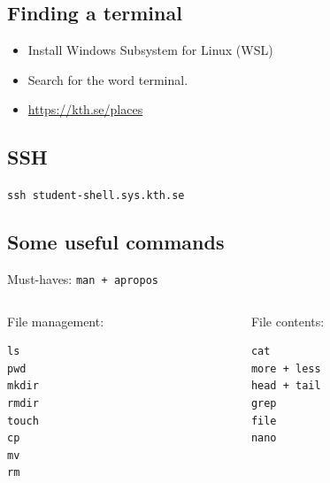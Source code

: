 \subsection{Finding a terminal}

\begin{frame}
  \begin{example}[Windows]
    \begin{itemize}
      \item Install Windows Subsystem for Linux (WSL)
    \end{itemize}
  \end{example}

  \begin{example}[Mac]
    \begin{itemize}
      \item Search for the word terminal.
    \end{itemize}
  \end{example}

  \begin{remark}
    \begin{itemize}
      \item \url{https://kth.se/places}
    \end{itemize}
  \end{remark}
\end{frame}

\subsection{SSH}

\begin{frame}
  \lstinline{ssh student-shell.sys.kth.se}
\end{frame}

\subsection{Some useful commands}

\begin{frame}[fragile]
  Must-haves: \lstinline{man + apropos}
  \vspace{1em}

  \begin{columns}[t]
    \begin{column}{0.5\columnwidth}
      File management:
      \begin{lstlisting}[numbers=none]
ls
pwd
mkdir
rmdir
touch
cp
mv
rm
      \end{lstlisting}
    \end{column}
    \begin{column}{0.5\columnwidth}
      File contents:
      \begin{lstlisting}[numbers=none]
cat
more + less
head + tail
grep
file
nano
      \end{lstlisting}
    \end{column}
  \end{columns}
\end{frame}


\begin{frame}[allowframebreaks]
  \printbibliography{}
\end{frame}
